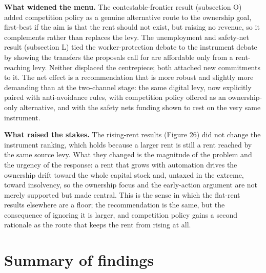 \documentclass[11pt]{article}
\begin{document}
\textbf{What widened the menu.} The contestable-frontier result
(subsection O) added competition policy as a genuine alternative route
to the ownership goal, first-best if the aim is that the rent should not
exist, but raising no revenue, so it complements rather than replaces
the levy. The unemployment and safety-net result (subsection L) tied the
worker-protection debate to the instrument debate by showing the
transfers the proposals call for are affordable only from a
rent-reaching levy. Neither displaced the centrepiece; both attached new
commitments to it. The net effect is a recommendation that is more
robust and slightly more demanding than at the two-channel stage: the
same digital levy, now explicitly paired with anti-avoidance rules, with
competition policy offered as an ownership-only alternative, and with
the safety net\textquotesingle s funding shown to rest on the very same
instrument.

\leavevmode{}%
\textbf{What raised the stakes.} The rising-rent results (Figure 26) did
not change the instrument ranking, which holds because a larger rent is
still a rent reached by the same source levy. What they changed is the
magnitude of the problem and the urgency of the response: a rent that
grows with automation drives the ownership drift toward the whole
capital stock and, untaxed in the extreme, toward insolvency, so the
ownership focus and the early-action argument are not merely supported
but made central. This is the sense in which the flat-rent results
elsewhere are a floor; the recommendation is the same, but the
consequence of ignoring it is larger, and competition policy gains a
second rationale as the route that keeps the rent from rising at all.

\hypertarget{summary-of-findings}{%
\section{Summary of findings}\label{summary-of-findings}}
\end{document}
